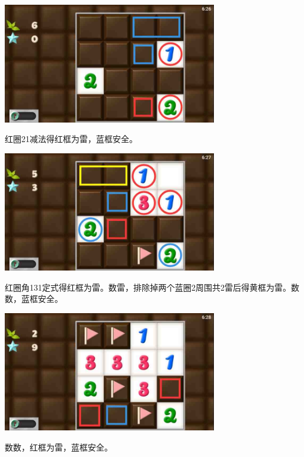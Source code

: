 \subsection{} %
\begin{center}
    \includegraphics[width=0.7\textwidth]{puzzlelow/106-1.jpg}
\end{center}
红圈21减法得红框为雷，蓝框安全。
\begin{center}
    \includegraphics[width=0.7\textwidth]{puzzlelow/106-2.jpg}
\end{center}
红圈角131定式得红框为雷。数雷，排除掉两个蓝圈2周围共2雷后得黄框为雷。数数，蓝框安全。
\begin{center}
    \includegraphics[width=0.7\textwidth]{puzzlelow/106-3.jpg}
\end{center}
数数，红框为雷，蓝框安全。


